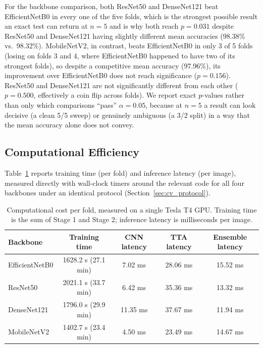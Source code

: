 \documentclass[11pt]{article}
\begin{document}
For the backbone comparison, both ResNet50 and DenseNet121 beat EfficientNetB0 in every one of the five folds, which is the strongest possible result an exact test can return at $n=5$ and is why both reach $p=0.031$ despite ResNet50 and DenseNet121 having slightly different mean accuracies (98.38\% vs.\ 98.32\%). MobileNetV2, in contrast, beats EfficientNetB0 in only 3 of 5 folds (losing on folds 3 and 4, where EfficientNetB0 happened to have two of its strongest folds), so despite a competitive mean accuracy (97.96\%), its improvement over EfficientNetB0 does not reach significance ($p=0.156$). ResNet50 and DenseNet121 are not significantly different from each other ($p=0.500$, effectively a coin flip across folds). We report exact $p$-values rather than only which comparisons ``pass'' $\alpha=0.05$, because at $n=5$ a result can look decisive (a clean 5/5 sweep) or genuinely ambiguous (a 3/2 split) in a way that the mean accuracy alone does not convey.

\subsection{Computational Efficiency}
\label{sec:efficiency}

Table~\ref{tab:efficiency} reports training time (per fold) and inference latency (per image), measured directly with wall-clock timers around the relevant code for all four backbones under an identical protocol (Section~\ref{sec:cv_protocol}).

\begin{table}[htbp]
\centering
\caption{Computational cost per fold, measured on a single Tesla T4 GPU. Training time is the sum of Stage 1 and Stage 2; inference latency is milliseconds per image.}
\label{tab:efficiency}
\small
\begin{tabular*}{\textwidth}{@{\extracolsep{\fill}}lcccc@{}}
\toprule
\textbf{Backbone} & \textbf{Training time} & \textbf{CNN latency} & \textbf{TTA latency} & \textbf{Ensemble latency} \\
\midrule
EfficientNetB0 & 1628.2 s (27.1 min) & 7.02 ms & 28.06 ms & 15.52 ms \\
ResNet50     & 2021.1 s (33.7 min) & 6.42 ms & 35.36 ms & 13.32 ms \\
DenseNet121  & 1796.0 s (29.9 min) & 11.35 ms & 37.67 ms & 11.94 ms \\
MobileNetV2  & 1402.7 s (23.4 min) & 4.50 ms & 23.49 ms & 14.67 ms \\
\bottomrule
\end{tabular*}
\end{table}
\end{document}
